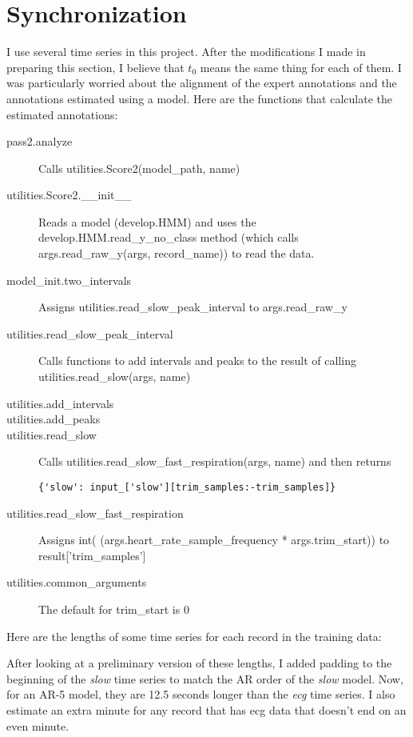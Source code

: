\documentclass[12pt]{article}
\begin{document}
\section{Synchronization}
\label{sec:sync}

I use several time series in this project.  After the modifications I
made in preparing this section, I believe that $t_0$ means the same
thing for each of them.  I was particularly worried about the alignment
of the expert annotations and the annotations estimated using a model.
Here are the functions that calculate the estimated annotations:
\begin{description}
\item[pass2.analyze] Calls utilities.Score2(model\_path, name)
\item[utilities.Score2.\_\_init\_\_] Reads a model (develop.HMM) and
  uses the develop.HMM.read\_y\_no\_class method (which calls
  args.read\_raw\_y(args, record\_name)) to read the data.
\item[model\_init.two\_intervals] Assigns
  utilities.read\_slow\_peak\_interval to args.read\_raw\_y
\item[utilities.read\_slow\_peak\_interval] Calls functions to add
  intervals and peaks to the result of calling
  utilities.read\_slow(args, name)
\item[utilities.add\_intervals] 
\item[utilities.add\_peaks]
\item[utilities.read\_slow] Calls
  utilities.read\_slow\_fast\_respiration(args, name) and then returns
\begin{verbatim}
{'slow': input_['slow'][trim_samples:-trim_samples]}
\end{verbatim}
\item[utilities.read\_slow\_fast\_respiration] Assigns int(
  (args.heart\_rate\_sample\_frequency * args.trim\_start)) to
  result['trim\_samples']
\item[utilities.common\_arguments] The default for trim\_start is 0
\end{description}

Here are the lengths of some time series for each record in the
training data:



After looking at a preliminary version of these lengths, I added
padding to the beginning of the \emph{slow} time series to match the
AR order of the \emph{slow} model.  Now, for an AR-5 model, they are
12.5 seconds longer than the \emph{ecg} time series.  I also estimate
an extra minute for any record that has ecg data that doesn't end on
an even minute.
\end{document}
